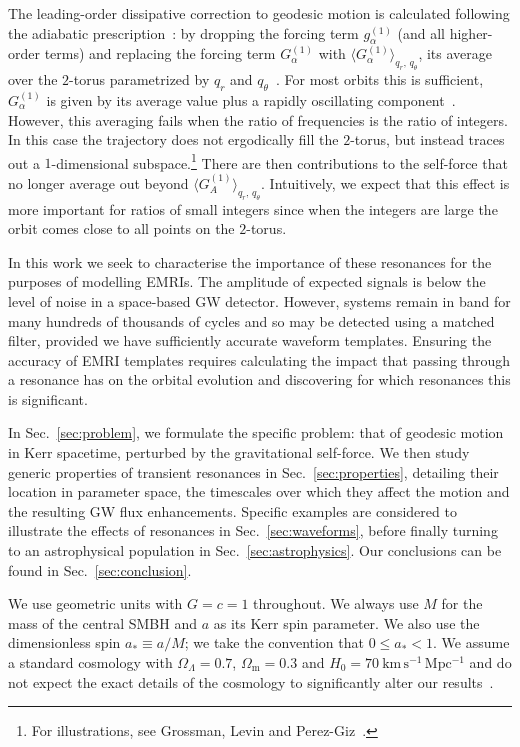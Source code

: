 \documentclass[aps,prd,amsfonts,amssymb,amsmath,nofootinbib,showpacs,superscriptaddress,twocolumn,floatfix]{revtex4-1}
\newcommand{\secref}[1]{Sec.~\ref{sec:#1}}
\newcommand{\units}[1]{\ensuremath{~\mathrm{#1}}}
\newcommand{\sub}[1]{\ensuremath{_\mathrm{#1}}}
\begin{document}
The leading-order dissipative correction to geodesic motion is calculated following the adiabatic prescription~\cite{Hinderer2008}: by dropping the forcing term $g_\alpha^{(1)}$ (and all higher-order terms) and replacing the forcing term $G_\alpha^{(1)}$ with $\langle G_\alpha^{(1)}\rangle_{q_r,\,q_\theta}$, its average over the $2$-torus parametrized by $q_r$ and $q_\theta$~\cite{Drasco2005}. For most orbits this is sufficient, $G_\alpha^{(1)}$ is given by its average value plus a rapidly oscillating component~\cite{Arnold1988}. %
However, this averaging fails when the ratio of frequencies is the ratio of integers. In this case the trajectory does not ergodically fill the $2$-torus, but instead traces out a $1$-dimensional subspace.\footnote{For illustrations, see Grossman, Levin and Perez-Giz~\cite{Grossman2012}.} There are then contributions to the self-force that no longer average out beyond $\langle G_A^{(1)}\rangle_{q_r,\,q_\theta}$. Intuitively, we expect that this effect is more important for ratios of small integers since when the integers are large the orbit comes close to all points on the $2$-torus.

In this work we seek to characterise the importance of these resonances for the purposes of modelling EMRIs. The amplitude of expected signals is below the level of noise in a space-based GW detector. However, systems remain in band for many hundreds of thousands of cycles and so may be detected using a matched filter, provided we have sufficiently accurate waveform templates. Ensuring the accuracy of EMRI templates requires calculating the impact that passing through a resonance has on the orbital evolution and discovering for which resonances this is significant.

In \secref{problem}, we formulate the specific problem: that of geodesic motion in Kerr spacetime, perturbed  by the gravitational self-force. We then study generic properties of transient resonances in \secref{properties}, detailing their location in parameter space, the timescales over which they affect the motion and the resulting GW flux enhancements. Specific examples are considered to illustrate the effects of resonances in \secref{waveforms}, before finally turning to an astrophysical population in \secref{astrophysics}. Our conclusions can be found in \secref{conclusion}.

We use geometric units with $G = c = 1$ throughout. We always use $M$ for the mass of the central SMBH and $a$ as its Kerr spin parameter. We also use the dimensionless spin $a_\ast \equiv a/M$; we take the convention that $0 \leq a_\ast < 1$. We assume a standard cosmology with $\Omega_\Lambda = 0.7$, $\Omega\sub{m} = 0.3$ and $H_0 = 70\units{km\, s^{-1}\, Mpc^{-1}}$ and do not expect the exact details of the cosmology to significantly alter our results~\cite{Mapelli2012}.
\end{document}
